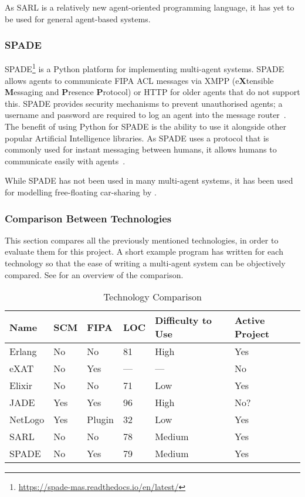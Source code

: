 As SARL is a relatively new agent-oriented programming language, it has yet to be used for general agent-based systems.

\subsubsection{SPADE}

SPADE\footnote{\url{https://spade-mas.readthedocs.io/en/latest/}} is a Python platform for implementing multi-agent systems.
SPADE allows agents to communicate FIPA ACL messages via XMPP (e\textbf{X}tensible \textbf{M}essaging and \textbf{P}resence \textbf{P}rotocol) or HTTP for older agents that do not support this.
SPADE provides security mechanisms to prevent unauthorised agents; a username and password are required to log an agent into the message router~\cite{gregori2006jabber}.
The benefit of using Python for SPADE is the ability to use it alongside other popular Artificial Intelligence libraries.
As SPADE uses a protocol that is commonly used for instant messaging between humans, it allows humans to communicate easily with agents~\cite{palanca2020spade}.

While SPADE has not been used in many multi-agent systems, it has been used for modelling free-floating car-sharing by .

\subsubsection{Comparison Between Technologies}

This section compares all the previously mentioned technologies, in order to evaluate them for this project.
A short example program has written for each technology so that the ease of writing a multi-agent system can be objectively compared.
See  for an overview of the comparison.

\begin{table}[ht]
    \centering
    \caption{Technology Comparison}\label{tab:tech_comparison}
    \begin{tabular}{llllll}
        \toprule
        Name & SCM & FIPA & LOC & Difficulty to Use & Active Project\\
        \midrule
        Erlang & No & No & 81 & High & Yes\\[0.5ex]
        eXAT & No & Yes & --- & --- & No\\[0.5ex]
        Elixir & No & No & 71 & Low & Yes\\[0.5ex]
        JADE & Yes & Yes & 96 & High & No?\\[0.5ex]
        NetLogo & Yes & Plugin & 32 & Low & Yes\\[0.5ex]
        SARL & No & No & 78 & Medium & Yes\\[0.5ex]
        SPADE & No & Yes & 79 & Medium & Yes\\
        \bottomrule
    \end{tabular}
\end{table}

